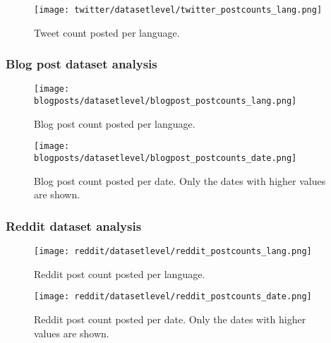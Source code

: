 \begin{figure}[H]
	\begin{center}
		\texttt{[image: twitter/datasetlevel/twitter\_postcounts\_lang.png]}
		\caption{Tweet count posted per language.}
		\label{fig:twitter_postcounts_lang}
	\end{center}
\end{figure}
\subsubsection{Blog post dataset analysis}

\begin{figure}[H]
	\begin{center}
		\texttt{[image: blogposts/datasetlevel/blogpost\_postcounts\_lang.png]}
		\caption{Blog post count posted per language.}
		\label{fig:blogpost_postcounts_lang}
	\end{center}
\end{figure}

\begin{figure}[H]
	\begin{center}
		\texttt{[image: blogposts/datasetlevel/blogpost\_postcounts\_date.png]}
		\caption{Blog post count posted per date. Only the dates with higher values are shown.}
		\label{fig:blogpost_postcounts_date}
	\end{center}
\end{figure}


\subsubsection{Reddit dataset analysis}

\begin{figure}[H]
	\begin{center}
		\texttt{[image: reddit/datasetlevel/reddit\_postcounts\_lang.png]}
		\caption{Reddit post count posted per language.}
		\label{fig:reddit_postcounts_lang}
	\end{center}
\end{figure}

\begin{figure}[H]
	\begin{center}
		\texttt{[image: reddit/datasetlevel/reddit\_postcounts\_date.png]}
		\caption{Reddit post count posted per date. Only the dates with higher values are shown.}
		\label{fig:reddit_postcounts_date}
	\end{center}
\end{figure}

